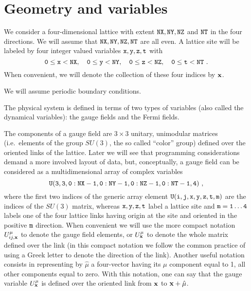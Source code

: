 \section{Geometry and variables}
\label{geometryand}

We consider a four-dimensional lattice with extent $ \tt NX, NY, NZ$ and 
$\tt NT$ in the four directions.  
We will assume that $\tt NX,NY,NZ,NT$ are all even.
A lattice site will be labeled by four integer valued variables
$\tt x,y,z,t$ with
%
\begin{equation}
\tt 0 \le x < NX, \quad 0 \le y < NY, \quad 0 \le z < NZ, 
\quad 0 \le t < NT \ .
\label{sites}
\end{equation}
%
When convenient, we will denote the collection of these four indices
by ${\bf x}$.

We will assume periodic boundary conditions.

The physical system is defined in terms of two types of variables
(also called the dynamical variables):
the gauge fields and the Fermi fields.

The components of a gauge field are $3 \times 3$ unitary, unimodular matrices
(i.e.~elements of the group $SU(3)$, the so called ``color'' group) defined
over the oriented links of the lattice.  Later we will see that programming
considerations demand a more involved layout of data, but, conceptually,
a gauge field can be considered as a multidimensional array of complex
variables
%
\begin{equation}
\tt U(3,3,0:NX-1,0:NY-1,0:NZ-1,0:NT-1,4) \ ,
\label{gaugefield}
\end{equation}
%
where the first two indices of the generic array element
$\tt U(i,j,x,y,z,t,m)$ are the indices of the $SU(3)$ matrix, whereas
$\tt x,y,z,t$ label a lattice site and $\tt m=1 \dots 4$ labels one of the
four lattice links having origin at the site and oriented in the
positive $\tt m$ direction.  When convenient we will use the more
compact notation $U_{ij,{\bf x}}^{\mu}$ to denote the gauge
field elements, or $U_{\bf x}^{\mu}$ to denote the whole matrix defined
over the link (in this compact notation we follow the common practice of
using a Greek letter to denote the direction
of the link).  Another useful notation consists in representing by
$\hat\mu$ a four-vector having its $\mu$ component equal to 1,
all other components equal to zero.  With this notation, one can say
that the gauge variable $U_{\bf x}^{\mu}$ is defined over the
oriented link from ${\bf x}$ to ${\bf x}+{\hat\mu}$.

